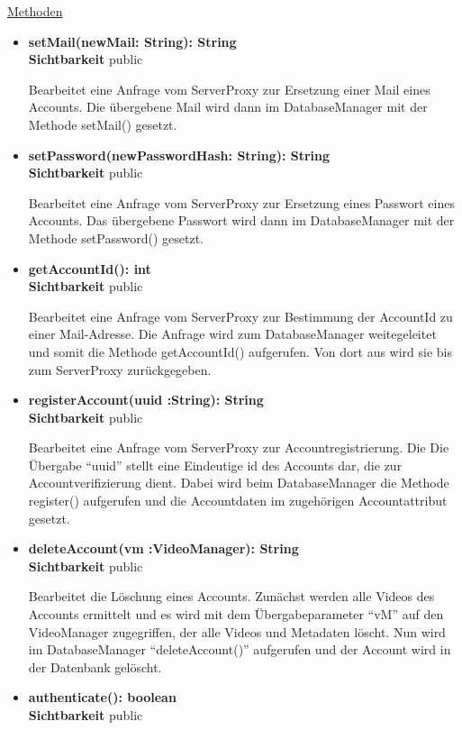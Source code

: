 \underline{Methoden}
\begin{itemize}
\itemsep0pt
\item \textbf{setMail(newMail: String): String}\hfill\\
\textbf{Sichtbarkeit} public

Bearbeitet eine Anfrage vom ServerProxy zur Ersetzung einer Mail eines Accounts. Die übergebene Mail wird dann im DatabaseManager mit der Methode setMail() gesetzt.

\item \textbf{setPassword(newPasswordHash: String): String}\hfill\\
\textbf{Sichtbarkeit} public

Bearbeitet eine Anfrage vom ServerProxy zur Ersetzung eines Passwort eines Accounts. Das übergebene Passwort wird dann im DatabaseManager mit der Methode setPassword() gesetzt.

\item \textbf{getAccountId(): int}\hfill\\
\textbf{Sichtbarkeit} public

Bearbeitet eine Anfrage vom ServerProxy zur Bestimmung der AccountId zu einer Mail-Adresse. Die Anfrage wird zum DatabaseManager weitegeleitet und somit die Methode getAccountId() aufgerufen. Von dort aus wird sie bis zum ServerProxy zurückgegeben.  

\item \textbf{registerAccount(uuid :String): String}\hfill\\
\textbf{Sichtbarkeit} public

Bearbeitet eine Anfrage vom ServerProxy zur Accountregistrierung. Die Die Übergabe ``uuid'' stellt eine Eindeutige id des Accounts dar, die zur Accountverifizierung dient. Dabei wird beim DatabaseManager die Methode register() aufgerufen und die Accountdaten im zugehörigen Accountattribut gesetzt. 

\item \textbf{deleteAccount(vm :VideoManager): String}\hfill\\
\textbf{Sichtbarkeit} public

Bearbeitet die Löschung eines Accounts. Zunächst werden alle Videos des Accounts ermittelt und es wird mit dem Übergabeparameter ``vM'' auf den VideoManager zugegriffen, der alle Videos und Metadaten löscht. Nun wird im DatabaseManager ``deleteAccount()'' aufgerufen und der Account wird in der Datenbank gelöscht.

\item \textbf{authenticate(): boolean}\hfill\\
\textbf{Sichtbarkeit} public


\end{itemize}
